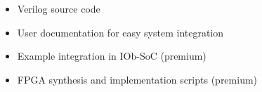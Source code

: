 \begin{itemize}
\item Verilog source code
\item User documentation for easy system integration
\item Example integration in IOb-SoC (premium)
\item FPGA synthesis and implementation scripts (premium)
\end{itemize}
